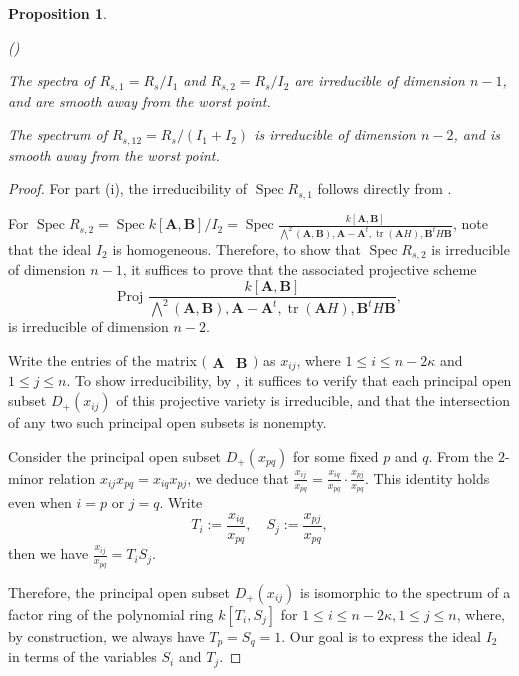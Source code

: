 \documentclass[pdflatex,sn-mathphys-num]{sn-jnl}%
\theoremstyle{thmstyleone}%
\newtheorem{proposition}[subsubsection]{Proposition}%
\theoremstyle{thmstyletwo}%
\numberwithin{equation}{subsection}
\theoremstyle{thmstylethree}%
\newcommand{\bA}{\ensuremath{\mathbf{A}}\xspace}
\newcommand{\bB}{\ensuremath{\mathbf{B}}\xspace}
\DeclareMathOperator{\Spec}{Spec}
\DeclareMathOperator{\tr}{tr}
\newenvironment{altenumerate}
	{\begin{list}
			{(\theenumi) }
			{\usecounter{enumi}
				\setlength{\labelwidth}{0pt}
				\setlength{\labelsep}{0pt}
				\setlength{\leftmargin}{0pt}
				\setlength{\itemsep}{\the\smallskipamount}
				\renewcommand{\theenumi}{\roman{enumi}}
		}}
		{\end{list}}
\begin{document}
\begin{proposition}\label{max_red:irr}
\begin{altenumerate}
\item The spectra of $R_{s,1}=R_{s}/I_1$ and $R_{s,2}=R_{s}/I_2$ are irreducible of dimension $n-1$, and are smooth away from the worst point.
\item The spectrum of $R_{s,12}=R_{s}/(I_1+I_2)$ is irreducible of dimension $n-2$, and is smooth away from the worst point.
\end{altenumerate}
\end{proposition}
\begin{proof}
For part (i), the irreducibility of $\Spec R_{s,1}$ follows directly from \cite[(2.11)(1.1)]{BU1998}.

For $\Spec R_{s,2}=\Spec k[\bA,\bB]/I_2=\Spec \frac{k[\bA,\bB]}{\bigwedge^2(\bA,\bB),\bA-\bA^t,\tr(\bA H),\bB^t H\bB}$, note that the ideal $I_2$ is homogeneous. Therefore, to show that $\Spec R_{s,2}$ is irreducible of dimension $n-1$, it suffices to prove that the associated projective scheme
\[
	\text{Proj }\frac{k[\bA,\bB]}{\bigwedge^2(\bA,\bB),\bA-\bA^t,\tr(\bA H),\bB^tH\bB},
\]
is irreducible of dimension $n-2$.

Write the entries of the matrix $\bigl(\begin{matrix}\bA&\bB\end{matrix}\bigr)$ as $x_{ij}$, where $1\leq i\leq n-2\kappa$ and $1\leq j\leq n$.
To show irreducibility, by \cite[\href{https://stacks.math.columbia.edu/tag/01OM}{01OM}]{Stacks}, it suffices to verify that each principal open subset $D_+(x_{ij})$ of this projective variety is irreducible, and that the intersection of any two such principal open subsets is nonempty.
				
				
Consider the principal open subset $D_+(x_{pq})$ for some fixed $p$ and $q$.
From the $2$-minor relation $x_{ij}x_{pq}=x_{iq}x_{pj}$, we deduce that
$
\frac{x_{ij}}{x_{pq}}=\frac{x_{iq}}{x_{pq}}\cdot\frac{x_{pj}}{x_{pq}}.
$
This identity holds even when $i=p$ or $j=q$. Write
\begin{equation*}
	T_i:=\frac{x_{iq}}{x_{pq}},\quad S_j:=\frac{x_{pj}}{x_{pq}},
\end{equation*}
then we have $\frac{x_{ij}}{x_{pq}}=T_i S_j$.

Therefore, the principal open subset $D_+(x_{ij})$ is isomorphic to the spectrum of a factor ring of the polynomial ring $k[T_i, S_j]$ for $1\leq i\leq n-2\kappa, 1\leq j\leq n$, where, by construction, we always have $T_p=S_q=1$.
Our goal is to express the ideal $I_2$ in terms of the variables $S_i$ and  $T_j$.
				

\end{proof}
\end{document}
